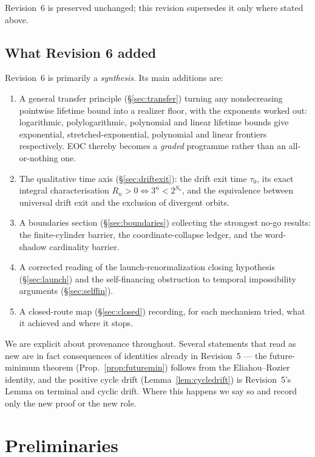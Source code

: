 \documentclass[11pt]{article}
\theoremstyle{plain}
\theoremstyle{definition}
\theoremstyle{remark}
\begin{document}
Revision~6 is preserved unchanged; this revision supersedes it only where stated above.

\subsection{What Revision 6 added}

Revision~6 is primarily a \emph{synthesis}. Its main additions are:

\begin{enumerate}[leftmargin=1.6em]
\item A general transfer principle (\S\ref{sec:transfer}) turning any nondecreasing pointwise lifetime bound into
  a realizer floor, with the exponents worked out: logarithmic, polylogarithmic, polynomial and
  linear lifetime bounds give exponential, stretched-exponential, polynomial and linear frontiers
  respectively. EOC thereby becomes a \emph{graded} programme rather than an all-or-nothing one.
\item The qualitative time axis (\S\ref{sec:driftexit}): the drift exit time $\tau_0$, its exact
  integral characterisation $R_n>0\iff 3^n<2^{S_n}$, and the equivalence between universal drift
  exit and the exclusion of divergent orbits.
\item A boundaries section (\S\ref{sec:boundaries}) collecting the strongest no-go results: the
  finite-cylinder barrier, the coordinate-collapse ledger, and the word-shadow cardinality barrier.
\item A corrected reading of the launch-renormalization closing hypothesis (\S\ref{sec:launch}) and
  the self-financing obstruction to temporal impossibility arguments (\S\ref{sec:selffin}).
\item A closed-route map (\S\ref{sec:closed}) recording, for each mechanism tried, what it achieved
  and where it stops.
\end{enumerate}

We are explicit about provenance throughout. Several statements that read as new are in fact
consequences of identities already in Revision~5 --- the future-minimum theorem
(Prop.~\ref{prop:futuremin}) follows from the Eliahou--Rozier identity, and the positive cycle
drift (Lemma~\ref{lem:cycledrift}) is Revision~5's Lemma on terminal and cyclic drift. Where this
happens we say so and record only the new proof or the new role.

\section{Preliminaries}\label{sec:prelim}
\end{document}
